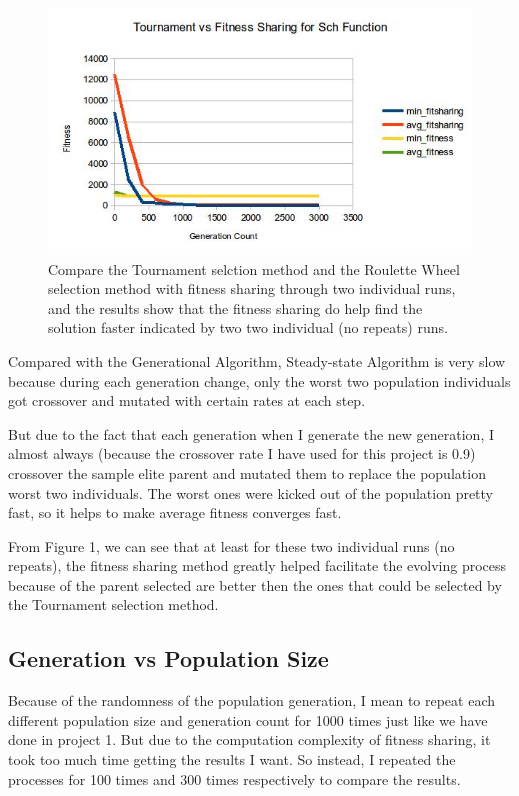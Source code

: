 \documentclass[10pt,b5paper]{article}
\begin{document}
\begin{figure}[htb]
\centering
\includegraphics[width=.9\linewidth]{./indi.jpg}
\caption{Compare the Tournament selction method and the Roulette Wheel selection method with fitness sharing through two individual runs, and the results show that the fitness sharing do help find the solution faster indicated by two two individual (no repeats) runs.}
\end{figure}
Compared with the Generational Algorithm, Steady-state Algorithm is very slow because during each generation change, only the worst two population individuals got crossover and mutated with certain rates at each step.

But due to the fact that each generation when I generate the new generation, I almost always (because the crossover rate I have used for this project is 0.9) crossover the sample elite parent and mutated them to replace the population worst two individuals. The worst ones were kicked out of the population pretty fast, so it helps to make average fitness converges fast.

From Figure 1, we can see that at least for these two individual runs (no repeats), the fitness sharing method greatly helped facilitate the evolving process because of the parent selected are better then the ones that could be selected by the Tournament selection method. 
\subsection{Generation vs Population Size}
\label{sec-3-2}

Because of the randomness of the population generation, I mean to repeat each different population size and generation count for 1000 times just like we have done in project 1. But due to the computation complexity of fitness sharing, it took too much time getting the results I want. So instead, I repeated the processes for 100 times and 300 times respectively to compare the results. 
\end{document}
